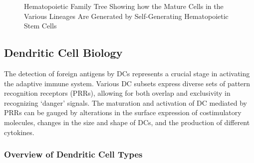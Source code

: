 \documentclass[
]{article}
\begin{document}
\begin{figure}


\caption{\label{fig-hsc}Hematopoietic Family Tree Showing how the Mature
Cells in the Various Lineages Are Generated by Self-Generating
Hematopoietic Stem Cells}

\end{figure}%

\subsection{Dendritic Cell Biology}\label{dendritic-cell-biology}

The detection of foreign antigens by DCs represents a crucial stage in
activating the adaptive immune system. Various DC subsets express
diverse sets of pattern recognition receptors (PRRs), allowing for both
overlap and exclusivity in recognizing `danger' signals. The maturation
and activation of DC mediated by PRRs can be gauged by alterations in
the surface expression of costimulatory molecules, changes in the size
and shape of DCs, and the production of different cytokines.

\subsubsection{Overview of Dendritic Cell
Types}\label{overview-of-dendritic-cell-types}
\end{document}

